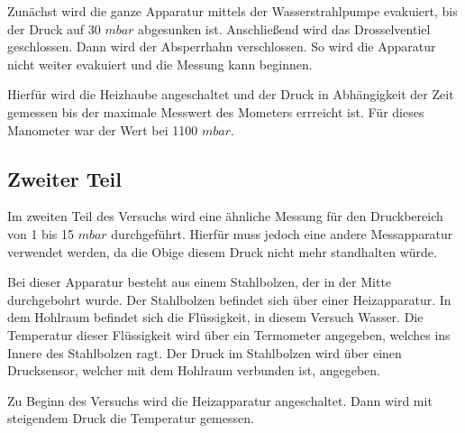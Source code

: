 Zunächst wird die ganze Apparatur mittels der Wasserstrahlpumpe evakuiert, bis der Druck auf 30 $mbar$ abgesunken ist.
Anschließend wird das Drosselventiel geschlossen.
Dann wird der Absperrhahn verschlossen.
So wird die Apparatur nicht weiter evakuiert und die Messung kann beginnen.

Hierfür wird die Heizhaube angeschaltet und der Druck in Abhängigkeit der Zeit gemessen bis der maximale Messwert des Mometers errreicht ist.
Für dieses Manometer war der Wert bei 1100 $mbar$.

\subsection{Zweiter Teil}
Im zweiten Teil des Versuchs wird eine ähnliche Messung für den Druckbereich von 1 bis 15 $mbar$ durchgeführt.
Hierfür muss jedoch eine andere Messapparatur verwendet werden, da die Obige diesem Druck nicht mehr standhalten würde.

Bei dieser Apparatur besteht aus einem Stahlbolzen, der in der Mitte durchgebohrt wurde.
Der Stahlbolzen befindet sich über einer Heizapparatur.
In dem Hohlraum befindet sich die Flüssigkeit, in diesem Versuch Wasser.
Die Temperatur dieser Flüssigkeit wird über ein Termometer angegeben, welches ins Innere des Stahlbolzen ragt.
Der Druck im Stahlbolzen wird über einen Drucksensor, welcher mit dem Hohlraum verbunden ist, angegeben.

Zu Beginn des Versuchs wird die Heizapparatur angeschaltet.
Dann wird mit steigendem Druck die Temperatur gemessen.